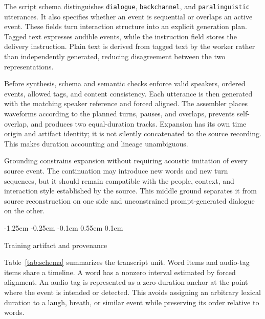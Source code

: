 \documentclass[10pt,twocolumn]{article}
\makeatletter
\renewcommand\subsection{%
  \@startsection{subsection}{2}{\z@}%
    {-1.25em \@plus -0.25em \@minus -0.1em}%
    {0.55em \@plus 0.1em}%
    {\normalfont\fontsize{10.5}{12.5}\selectfont\bfseries\raggedright
     \hyphenpenalty=10000\exhyphenpenalty=10000}}
\makeatother
\begin{document}
The script schema distinguishes \texttt{dialogue}, \texttt{backchannel}, and \texttt{paralinguistic} utterances. It also specifies whether an event is sequential or overlaps an active event. These fields turn interaction structure into an explicit generation plan. Tagged text expresses audible events, while the instruction field stores the delivery instruction. Plain text is derived from tagged text by the worker rather than independently generated, reducing disagreement between the two representations.

Before synthesis, schema and semantic checks enforce valid speakers, ordered events, allowed tags, and content consistency. Each utterance is then generated with the matching speaker reference and forced aligned. The assembler places waveforms according to the planned turns, pauses, and overlaps, prevents self-overlap, and produces two equal-duration tracks. Expansion has its own time origin and artifact identity; it is not silently concatenated to the source recording. This makes duration accounting and lineage unambiguous.

Grounding constrains expansion without requiring acoustic imitation of every source event. The continuation may introduce new words and new turn sequences, but it should remain compatible with the people, context, and interaction style established by the source. This middle ground separates it from source reconstruction on one side and unconstrained prompt-generated dialogue on the other.

\subsection{Training artifact and provenance}

Table~\ref{tab:schema} summarizes the transcript unit. Word items and audio-tag items share a timeline. A word has a nonzero interval estimated by forced alignment. An audio tag is represented as a zero-duration anchor at the point where the event is intended or detected. This avoids assigning an arbitrary lexical duration to a laugh, breath, or similar event while preserving its order relative to words.
\end{document}
